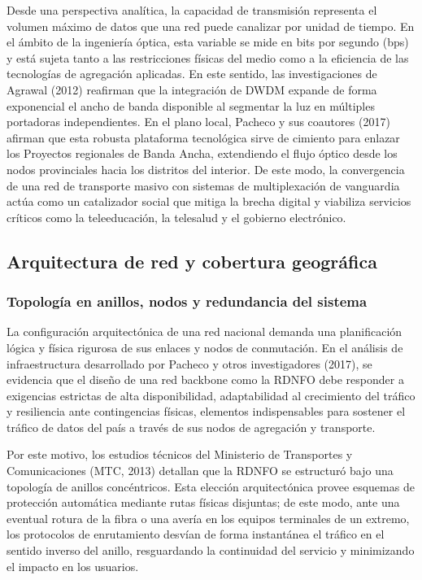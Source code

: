 Desde una perspectiva analítica, la capacidad de transmisión representa el volumen máximo de datos que una red puede canalizar por unidad de tiempo. En el ámbito de la ingeniería óptica, esta variable se mide en bits por segundo (bps) y está sujeta tanto a las restricciones físicas del medio como a la eficiencia de las tecnologías de agregación aplicadas. En este sentido, las investigaciones de Agrawal (2012) reafirman que la integración de DWDM expande de forma exponencial el ancho de banda disponible al segmentar la luz en múltiples portadoras independientes. En el plano local, Pacheco y sus coautores (2017) afirman que esta robusta plataforma tecnológica sirve de cimiento para enlazar los Proyectos regionales de Banda Ancha, extendiendo el flujo óptico desde los nodos provinciales hacia los distritos del interior. De este modo, la convergencia de una red de transporte masivo con sistemas de multiplexación de vanguardia actúa como un catalizador social que mitiga la brecha digital y viabiliza servicios críticos como la teleeducación, la telesalud y el gobierno electrónico.
\subsection{Arquitectura de red y cobertura geográfica}
\subsubsection{Topología en anillos, nodos y redundancia del sistema}
La configuración arquitectónica de una red nacional demanda una planificación lógica y física rigurosa de sus enlaces y nodos de conmutación. En el análisis de infraestructura desarrollado por Pacheco y otros investigadores (2017), se evidencia que el diseño de una red backbone como la RDNFO debe responder a exigencias estrictas de alta disponibilidad, adaptabilidad al crecimiento del tráfico y resiliencia ante contingencias físicas, elementos indispensables para sostener el tráfico de datos del país a través de sus nodos de agregación y transporte.

Por este motivo, los estudios técnicos del Ministerio de Transportes y Comunicaciones (MTC, 2013) detallan que la RDNFO se estructuró bajo una topología de anillos concéntricos. Esta elección arquitectónica provee esquemas de protección automática mediante rutas físicas disjuntas; de este modo, ante una eventual rotura de la fibra o una avería en los equipos terminales de un extremo, los protocolos de enrutamiento desvían de forma instantánea el tráfico en el sentido inverso del anillo, resguardando la continuidad del servicio y minimizando el impacto en los usuarios.

